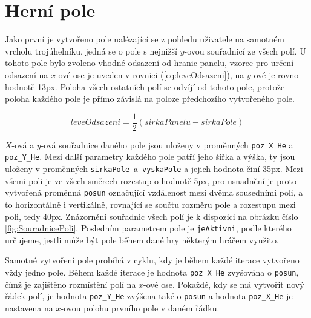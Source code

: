 \section{Herní pole}
\label{sec:HerniPole}
Jako první je vytvořeno pole nalézající se z pohledu uživatele na samotném vrcholu trojúhelníku, jedná se o pole s nejnižší $y$-ovou souřadnicí ze všech polí. U tohoto pole bylo zvoleno vhodné odsazení od hranic panelu, vzorec pro určení odsazení na $x$-ové ose je uveden v rovnici (\ref{eq:leveOdsazeni}), na $y$-ové je rovno hodnotě 13px. Poloha všech ostatních polí se odvíjí od tohoto pole, protože poloha každého pole je přímo závislá na poloze předchozího vytvořeného pole.

\begin{equation}
leveOdsazeni = \frac{1}{2}(sirkaPanelu - sirkaPole)
\label{eq:leveOdsazeni}
\end{equation}

$X$-ová a $y$-ová souřadnice daného pole jsou uloženy v proměnných \lstinline$poz_X_He$ a \lstinline$poz_Y_He$. Mezi další parametry každého pole patří jeho šířka a výška, ty jsou uloženy v proměnných \lstinline$sirkaPole$~a~\lstinline$vyskaPole$ a jejich hodnota činí 35px. Mezi všemi poli je ve všech směrech rozestup o hodnotě 5px, pro usnadnění je proto vytvořená proměnná \lstinline$posun$ označující vzdálenost mezi dvěma sousedními poli, a to horizontálně i vertikálně, rovnající se součtu rozměru pole a rozestupu mezi poli, tedy 40px. Znázornění souřadnic všech polí je k dispozici na obrázku číslo \ref{fig:SouradnicePoli}. Posledním parametrem pole je \lstinline$jeAktivni$, podle kterého určujeme, jestli může být pole během dané hry některým hráčem využito.

Samotné vytvoření pole probíhá v cyklu, kdy je během každé iterace vytvořeno vždy jedno pole. Během každé iterace je hodnota \lstinline$poz_X_He$ zvyšována o \lstinline$posun$, čímž je zajištěno rozmístění polí na $x$-ové ose. Pokaždé, kdy se má vytvořit nový řádek polí, je hodnota \lstinline$poz_Y_He$ zvýšena také o \lstinline$posun$ a hodnota \lstinline$poz_X_He$ je nastavena na $x$-ovou polohu prvního pole v daném řádku. 

